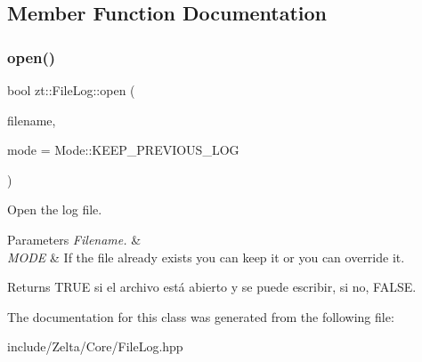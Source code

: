 \subsection{Member Function Documentation}
\mbox{\label{classzt_1_1_file_log_a4ef54c06277e13646f014d77a62fa2d6}} 
\subsubsection{\texorpdfstring{open()}{open()}}
{\footnotesize\ttfamily bool zt\+::\+File\+Log\+::open (\begin{DoxyParamCaption}\item[{const std\+::string \&}]{filename,  }\item[{Mode}]{mode = {\ttfamily Mode\+:\+:KEEP\+\_\+PREVIOUS\+\_\+LOG} }\end{DoxyParamCaption})}



Open the log file. 


\begin{DoxyParams}{Parameters}
{\em Filename.} & \\
\hline
{\em M\+O\+DE} & If the file already exists you can keep it or you can override it. \\
\hline
\end{DoxyParams}
\begin{DoxyReturn}{Returns}
T\+R\+UE si el archivo está abierto y se puede escribir, si no, F\+A\+L\+SE. 
\end{DoxyReturn}


The documentation for this class was generated from the following file\+:\begin{DoxyCompactItemize}
\item 
include/\+Zelta/\+Core/File\+Log.\+hpp\end{DoxyCompactItemize}
